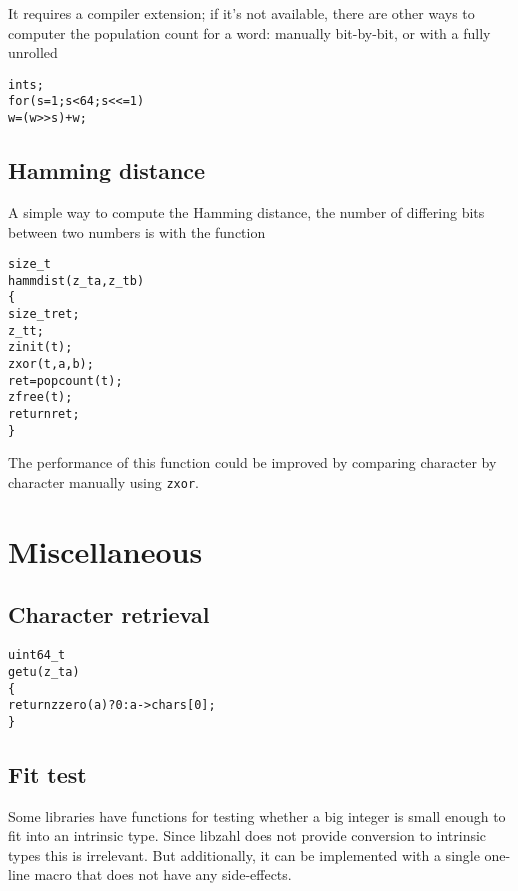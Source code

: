\noindent
It requires a compiler extension; if it's not
available, there are other ways to computer the
population count for a word: manually bit-by-bit,
or with a fully unrolled

\begin{alltt}
   int s;
   for (s = 1; s < 64; s <<= 1)
       w = (w >> s) + w;
\end{alltt}


\subsection{Hamming distance}
\label{sec:Hamming distance}

A simple way to compute the Hamming distance,
the number of differing bits between two
numbers is with the function

\begin{alltt}
   size_t
   hammdist(z_t a, z_t b)
   \{
       size_t ret;
       z_t t;
       zinit(t);
       zxor(t, a, b);
       ret = popcount(t);
       zfree(t);
       return ret;
   \}
\end{alltt}

\noindent
The performance of this function could
be improved by comparing character by
character manually using {\tt zxor}.


\newpage
\section{Miscellaneous}
\label{sec:Miscellaneous}


\subsection{Character retrieval}
\label{sec:Character retrieval}

\begin{alltt}
uint64_t
getu(z_t a)
\{
    return zzero(a) ? 0 : a->chars[0];
\}
\end{alltt}

\subsection{Fit test}
\label{sec:Fit test}

Some libraries have functions for testing
whether a big integer is small enough to
fit into an intrinsic type. Since libzahl
does not provide conversion to intrinsic
types this is irrelevant. But additionally,
it can be implemented with a single
one-line macro that does not have any
side-effects.

